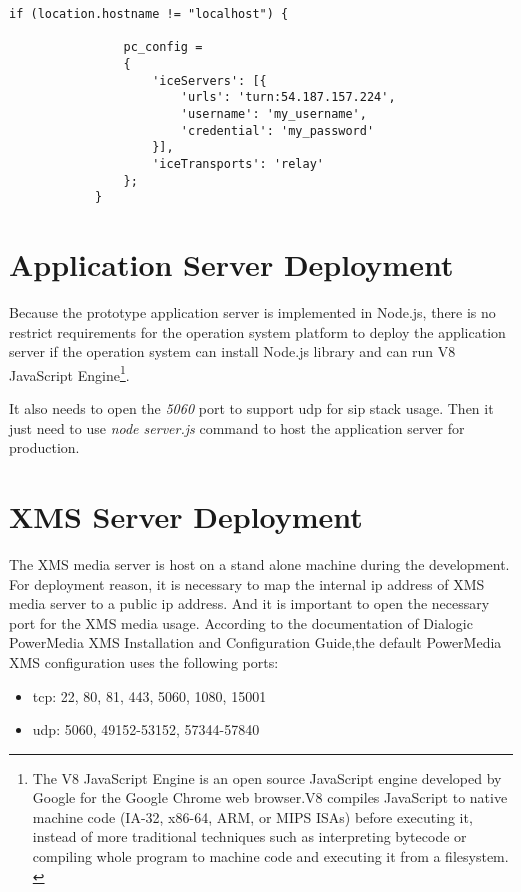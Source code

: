 \begin{lstlisting}[caption={Using TURN Server on WebRTC Client},label={code:client_turn_server}]
if (location.hostname != "localhost") {
  			
				pc_config = 
				{
					'iceServers': [{
						'urls': 'turn:54.187.157.224',
						'username': 'my_username',
						'credential': 'my_password'
					}],
					'iceTransports': 'relay'
				};
			}
\end{lstlisting}


\section{Application Server Deployment}

\par Because the prototype application server is implemented in Node.js, there is no restrict requirements for the operation system platform to deploy the application server if the operation system can install Node.js library and can run V8 JavaScript Engine\footnote{The V8 JavaScript Engine is an open source JavaScript engine developed by Google for the Google Chrome web browser.V8 compiles JavaScript to native machine code (IA-32, x86-64, ARM, or MIPS ISAs) before executing it, instead of more traditional techniques such as interpreting bytecode or compiling whole program to machine code and executing it from a filesystem. \cite{wiki:v8}}.

\par It also needs to open the \textit{5060} port to support \gls{udp} for \gls{sip} stack usage. Then it just need to use \textit{node server.js} command to host the application server for production.

\section{XMS Server Deployment}

\par The XMS media server is host on a stand alone machine during the development. For deployment reason, it is necessary to map the internal \gls{ip} address of XMS media server to a public \gls{ip} address. And it is important to open the necessary port for the XMS media usage. According to the documentation of Dialogic PowerMedia XMS 
Installation and Configuration Guide\cite{dialogic:xms_install},the default PowerMedia XMS configuration uses the following ports:
\begin{itemize}[topsep=-1em,parsep=0em,itemsep=0em]
 \item \gls{tcp}: 22, 80, 81, 443, 5060, 1080, 15001 
 \item \gls{udp}: 5060, 49152-53152, 57344-57840 
\end{itemize}

